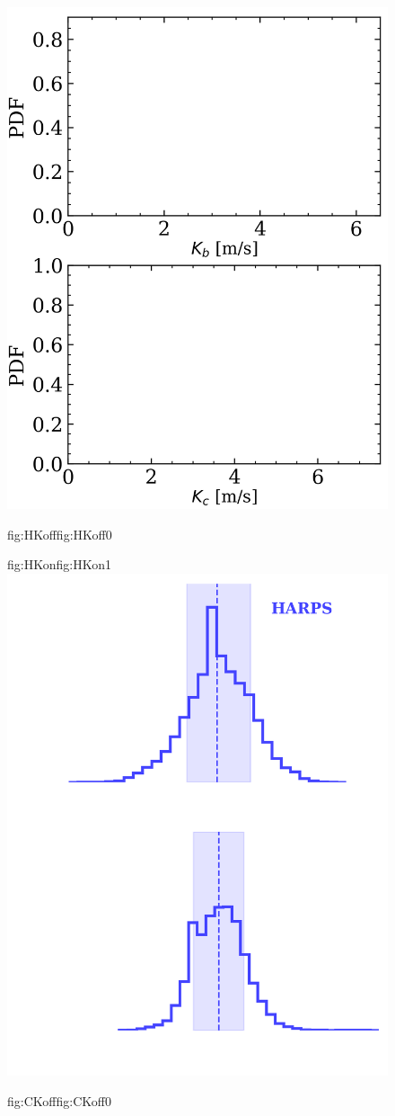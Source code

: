 \begin{figure}
  \centering
  \includegraphics[width=0.6\hsize]{figures/Kpdf_bkgd.png}%
  \hspace{-0.6\hsize}%
  \begin{ocg}{fig:HKoff}{fig:HKoff}{0}%
  \end{ocg}%
  \begin{ocg}{fig:HKon}{fig:HKon}{1}%
  \includegraphics[width=0.6\hsize]{figures/Kpdf_H.png}%
  \end{ocg}
  \hspace{-0.6\hsize}%
  \begin{ocg}{fig:CKoff}{fig:CKoff}{0}%

\end{ocg}
\end{figure}
